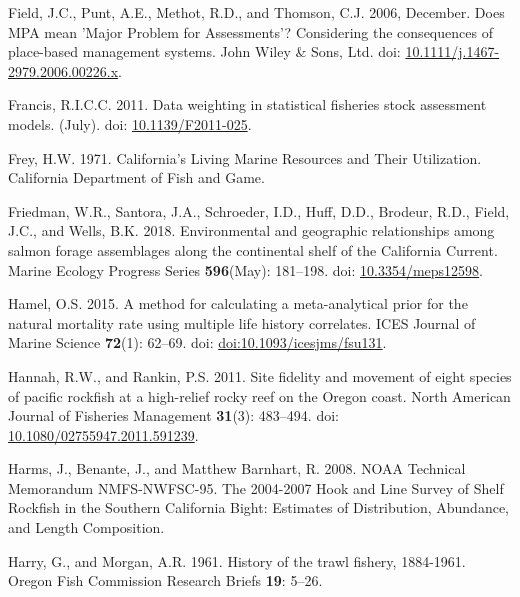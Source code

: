 \documentclass[
  english,
  a4paper,
]{article}
\newlength{\cslhangindent}
\newlength{\cslentryspacingunit} %
\newenvironment{CSLReferences}[2] %
 {%
  \setlength{\parindent}{0pt}
  \ifodd #1
  \let\oldpar\par
  \def\par{\hangindent=\cslhangindent\oldpar}
  \fi
  \setlength{\parskip}{#2\cslentryspacingunit}
 }%
 {}
\begin{document}
\begin{CSLReferences}{1}{0}
\leavevmode{}%
Field, J.C., Punt, A.E., Methot, R.D., and Thomson, C.J. 2006, December. {Does MPA mean 'Major Problem for Assessments'? Considering the consequences of place-based management systems}. John Wiley \& Sons, Ltd. doi: \href{https://doi.org/10.1111/j.1467-2979.2006.00226.x}{10.1111/j.1467-2979.2006.00226.x}.

\leavevmode{}%
Francis, R.I.C.C. 2011. {Data weighting in statistical fisheries stock assessment models}. (July). doi: \href{https://doi.org/10.1139/F2011-025}{10.1139/F2011-025}.

\leavevmode{}%
Frey, H.W. 1971. {California's Living Marine Resources and Their Utilization. California Department of Fish and Game}.

\leavevmode{}%
Friedman, W.R., Santora, J.A., Schroeder, I.D., Huff, D.D., Brodeur, R.D., Field, J.C., and Wells, B.K. 2018. {Environmental and geographic relationships among salmon forage assemblages along the continental shelf of the California Current}. Marine Ecology Progress Series \textbf{596}(May): 181--198. doi: \href{https://doi.org/10.3354/meps12598}{10.3354/meps12598}.

\leavevmode{}%
Hamel, O.S. 2015. {A method for calculating a meta-analytical prior for the natural mortality rate using multiple life history correlates}. ICES Journal of Marine Science \textbf{72}(1): 62--69. doi: \href{https://doi.org/doi:10.1093/icesjms/fsu131}{doi:10.1093/icesjms/fsu131}.

\leavevmode{}%
Hannah, R.W., and Rankin, P.S. 2011. {Site fidelity and movement of eight species of pacific rockfish at a high-relief rocky reef on the Oregon coast}. North American Journal of Fisheries Management \textbf{31}(3): 483--494. doi: \href{https://doi.org/10.1080/02755947.2011.591239}{10.1080/02755947.2011.591239}.

\leavevmode{}%
Harms, J., Benante, J., and Matthew Barnhart, R. 2008. {NOAA Technical Memorandum NMFS-NWFSC-95. The 2004-2007 Hook and Line Survey of Shelf Rockfish in the Southern California Bight: Estimates of Distribution, Abundance, and Length Composition}.

\leavevmode{}%
Harry, G., and Morgan, A.R. 1961. {History of the trawl fishery, 1884-1961}. Oregon Fish Commission Research Briefs \textbf{19}: 5--26.


\end{CSLReferences}
\end{document}
